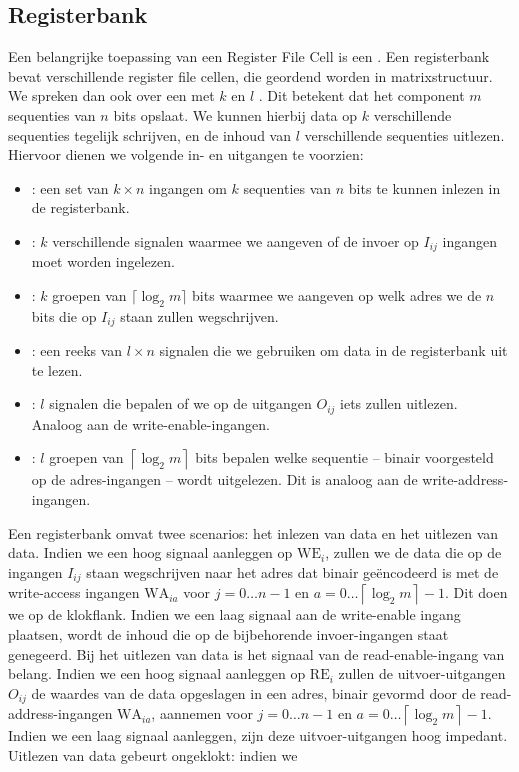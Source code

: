 \subsection{Registerbank}
Een belangrijke toepassing van een Register File Cell is een . Een registerbank bevat verschillende register file cellen, die geordend worden in matrixstructuur. We spreken dan ook over een  met $k$  en $l$ . Dit betekent dat het component $m$ sequenties van $n$ bits opslaat. We kunnen hierbij data op $k$ verschillende sequenties tegelijk schrijven, en de inhoud van $l$ verschillende sequenties uitlezen. Hiervoor dienen we volgende in- en uitgangen te voorzien:
\begin{itemize}
 \item {}: een set van $k\times n$ ingangen om $k$ sequenties van $n$ bits te kunnen inlezen in de registerbank.
 \item {}: $k$ verschillende signalen waarmee we aangeven of de invoer op $I_{ij}$ ingangen moet worden ingelezen.
 \item {}: $k$ groepen van $\lceil\log_2m\rceil$ bits waarmee we aangeven op welk adres we de $n$ bits die op $I_{ij}$ staan zullen wegschrijven.
 \item {}: een reeks van $l\times n$ signalen die we gebruiken om data in de registerbank uit te lezen.
 \item {}: $l$ signalen die bepalen of we op de uitgangen $O_{ij}$ iets zullen uitlezen. Analoog aan de write-enable-ingangen.
 \item {}: $l$ groepen van $\left\lceil\log_2m\right\rceil$ bits bepalen welke sequentie -- binair voorgesteld op de adres-ingangen -- wordt uitgelezen. Dit is analoog aan de write-address-ingangen.
\end{itemize}
Een registerbank omvat twee scenarios: het inlezen van data en het uitlezen van data. Indien we een hoog signaal aanleggen op $\mbox{WE}_i$, zullen we de data die op de ingangen $I_{ij}$ staan wegschrijven naar het adres dat binair ge\"encodeerd is met de write-access ingangen $\mbox{WA}_{ia}$ voor $j=0\ldots n-1$ en $a=0\ldots\left\lceil\log_2m\right\rceil-1$. Dit doen we op de klokflank. Indien we een laag signaal aan de write-enable ingang plaatsen, wordt de inhoud die op de bijbehorende invoer-ingangen staat genegeerd. Bij het uitlezen van data is het signaal van de read-enable-ingang van belang. Indien we een hoog signaal aanleggen op $\mbox{RE}_i$ zullen de uitvoer-uitgangen $O_{ij}$ de waardes van de data opgeslagen in een adres, binair gevormd door de read-address-ingangen $\mbox{WA}_{ia}$, aannemen voor $j=0\ldots n-1$ en $a=0\ldots\left\lceil\log_2m\right\rceil-1$. Indien we een laag signaal aanleggen, zijn deze uitvoer-uitgangen hoog impedant. Uitlezen van data gebeurt ongeklokt: indien we
